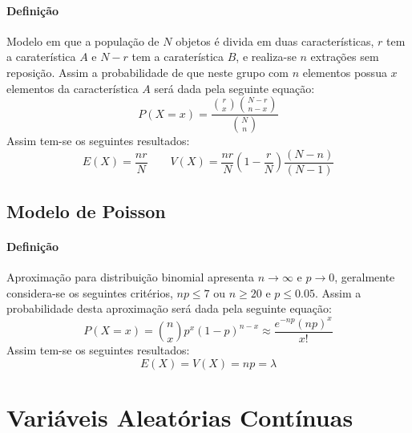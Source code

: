 \documentclass{article}
\begin{document}
            \paragraph{Definição}Modelo em que a população de $N$ objetos é divida em duas características, $r$ tem a caraterística $A$ e $N-r$ tem a caraterística $B$, e realiza-se $n$ extrações sem reposição. Assim a probabilidade de que neste grupo com $n$ elementos possua $x$ elementos da característica $A$ será dada pela seguinte equação:
                \begin{equation}
                    \boxed{
                        P(X = x) = \frac{\binom{r}{x}\binom{N-r}{n-x}}{\binom{N}{n}}
                    }
                \end{equation}
            Assim tem-se os seguintes resultados:
                \begin{equation}
                    \boxed{
                        E(X) = \frac{nr}{N}
                    }
                    \qquad
                    \boxed{
                        V(X) = \frac{nr}{N} \left(1 - \frac{r}{N}\right)\frac{(N-n)}{(N-1)}
                    }
                \end{equation}

        \subsection{Modelo de Poisson}
            \paragraph{Definição}Aproximação para distribuição binomial apresenta $n\to\infty$ e $p\to 0$, geralmente considera-se os seguintes critérios, $np\le 7$ ou $n\ge 20$ e $p\le 0.05$. Assim a probabilidade desta aproximação será dada pela seguinte equação:
                \begin{equation}
                    \boxed{
                        P(X = x) = \binom{n}{x} p^{x}(1-p)^{n-x} \approx
                        \frac{e^{-np}(np)^{x}}{x!}
                    }
                \end{equation}
            Assim tem-se os seguintes resultados:
                \begin{equation}
                    \boxed{
                        E(X) = V(X) = np = \lambda
                    }
                \end{equation}
\newpage

    \section{Variáveis Aleatórias Contínuas}
\end{document}
